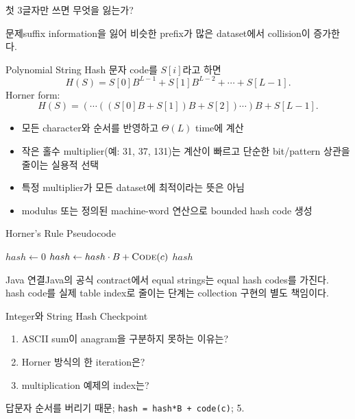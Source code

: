 \begin{frame}{첫 3글자만 쓰면 무엇을 잃는가?}
\centering{}
\begin{alertblock}{문제}suffix information을 잃어 비슷한 prefix가 많은 dataset에서 collision이 증가한다.\end{alertblock}
\end{frame}
\begin{frame}{Polynomial String Hash}
문자 code를 $S[i]$라고 하면
\[
H(S)=S[0]B^{L-1}+S[1]B^{L-2}+\cdots+S[L-1].
\]
Horner form:
\[
H(S)=(\cdots((S[0]B+S[1])B+S[2])\cdots)B+S[L-1].
\]
\begin{itemize}
\item 모든 character와 순서를 반영하고 $\Theta(L)$ time에 계산
\item 작은 홀수 multiplier(예: 31, 37, 131)는 계산이 빠르고 단순한 bit/pattern 상관을 줄이는 실용적 선택
\item 특정 multiplier가 모든 dataset에 최적이라는 뜻은 아님
\item modulus 또는 정의된 machine-word 연산으로 bounded hash code 생성
\end{itemize}
\end{frame}
\begin{frame}{Horner's Rule Pseudocode}
\begin{algorithmic}[1]
\State $hash\gets0$
  \State $hash\gets hash\cdot B+\Call{Code}{c}$
\EndFor
\State \Return $hash$
\EndProcedure
\end{algorithmic}
\begin{block}{Java 연결}Java의 공식 contract에서 equal strings는 equal hash codes를 가진다. hash code를 실제 table index로 줄이는 단계는 collection 구현의 별도 책임이다.\end{block}
\end{frame}
\begin{frame}{Integer와 String Hash Checkpoint}
\begin{enumerate}\item ASCII sum이 anagram을 구분하지 못하는 이유는?\item Horner 방식의 한 iteration은?\item multiplication 예제의 index는?\end{enumerate}
\begin{exampleblock}{답}문자 순서를 버리기 때문; \texttt{hash = hash*B + code(c)}; 5.\end{exampleblock}
\end{frame}
